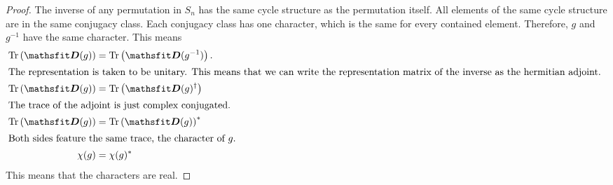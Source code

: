\documentclass[11pt, english, fleqn, DIV=15, headinclude, BCOR=1cm]{scrartcl}
\DeclareMathOperator{\Tr}{Tr}
\newcommand\inv{^{-1}}
\begin{document}
\begin{proof}
    The inverse of any permutation in $S_n$ has the same cycle structure as the
    permutation itself. All elements of the same cycle structure are in the
    same conjugacy class. Each conjugacy class has one character, which is the
    same for every contained element. Therefore, $g$ and $g\inv$ have the same
    character. This means
    \begin{align*}
        \Tr\del{\tens D(g)} &= \Tr\del{\tens D(g\inv)}. \\
        \intertext{%
            The representation is taken to be unitary. This means that we can
            write the representation matrix of the inverse as the hermitian
            adjoint.
        }
        \Tr\del{\tens D(g)} &= \Tr\del{\tens D(g)^\dagger} \\
        \intertext{%
            The trace of the adjoint is just complex conjugated.
        }
        \Tr\del{\tens D(g)} &= \Tr\del{\tens D(g)}^* \\
        \intertext{%
            Both sides feature the same trace, the character of $g$.
        }
        \chi(g) &= \chi(g)^*
    \end{align*}
    This means that the characters are real.
\end{proof}
\end{document}
